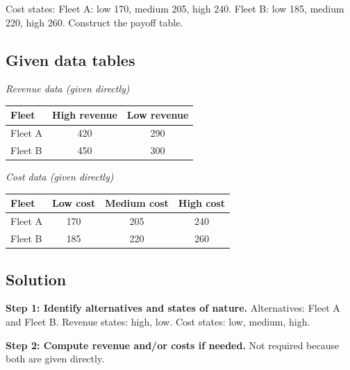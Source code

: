 \begin{ExamProblems}
		Cost states:
		Fleet A: low 170, medium 205, high 240.
		Fleet B: low 185, medium 220, high 260.
		Construct the payoff table.
		
		\subsection*{Given data tables}
		\begin{center}
			\begin{minipage}[t]{0.48\linewidth}
				\textit{Revenue data (given directly)}
				\begin{center}
					\begin{tabular}{l c c}
						\toprule
						Fleet & High revenue & Low revenue \\
						\midrule
						Fleet A & 420 & 290 \\
						Fleet B & 450 & 300 \\
						\bottomrule
					\end{tabular}
				\end{center}
			\end{minipage}
			\hfill
			\begin{minipage}[t]{0.48\linewidth}
				\textit{Cost data (given directly)}
				\begin{center}
					\begin{tabular}{l c c c}
						\toprule
						Fleet & Low cost & Medium cost & High cost \\
						\midrule
						Fleet A & 170 & 205 & 240 \\
						Fleet B & 185 & 220 & 260 \\
						\bottomrule
					\end{tabular}
				\end{center}
			\end{minipage}
		\end{center}
		
		\subsection*{Solution}
		\textbf{Step 1: Identify alternatives and states of nature.} Alternatives: Fleet A and Fleet B. Revenue states: high, low. Cost states: low, medium, high.
		
		\textbf{Step 2: Compute revenue and/or costs if needed.} Not required because both are given directly.
		

\end{ExamProblems}
